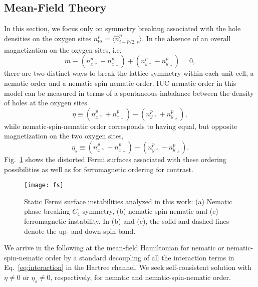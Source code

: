 \documentclass[prb, twocolumn,showpacs,preprintnumbers,amsmath,amssymb, floatfix]{revtex4}
\begin{document}
\subsection{Mean-Field Theory}
\label{subsec:model}
In this section, we focus only on symmetry breaking associated
with the hole densities on the oxygen sites $n^{p}_{\nu s} = \langle
\hat{n}^{p}_{i+\hat{\nu}/2 , s}\rangle$.
In the absence of an overall magnetization on the oxygen sites, i.e.
\begin{equation}
  m\equiv (n_{x\uparrow}^p-n_{x\downarrow}^{p}) + (n_{y\uparrow}^p - n_{y\downarrow}^p)=0,
  \label{eq:mag}
\end{equation}
there are  two
distinct ways to break the lattice symmetry within each unit-cell, a nematic order and a
nematic-spin nematic order.
IUC nematic order in this model can be measured in terms of
a spontaneous imbalance between the density of holes at the oxygen sites
\begin{equation}
  \eta\equiv (n_{x\uparrow}^p+n_{x\downarrow}^{p}) -(n_{y\uparrow}^p + n_{y\downarrow}^p),
  \label{eq:eta}
\end{equation}
while nematic-spin-nematic order corresponds to having equal, but opposite magnetization on the two oxygen sites, 
\begin{equation}
  \eta_s\equiv (n_{x\uparrow}^p-n_{x\downarrow}^{p}) -(n_{y\uparrow}^p - n_{y\downarrow}^p).
  \label{eq:etas}
\end{equation}
Fig.~\ref{fig:fs} shows the distorted Fermi surfaces associated with
these ordering possibilities as well as for ferromagnetic ordering for contrast.
\begin{figure}[tb]
  \begin{center}
    \texttt{[image: fs]}
  \end{center}
  \caption{Static Fermi surface instabilities analyzed in this work:
    (a) Nematic phase breaking $C_{4}$ symmetry, (b)
    nematic-spin-nematic and (c) ferromagnetic instability. 
    In (b) and (c), the solid and dashed lines denote the up- and down-spin band.
    }
  \label{fig:fs}
\end{figure}

We arrive in the following at the mean-field Hamiltonian for nematic or
nematic-spin-nematic order by a standard decoupling of all the
interaction terms in Eq.~\eqref{eq:interaction} in the Hartree
channel. We seek self-consistent solution with $\eta\neq0$ or
$\eta_s\neq0$, respectively, for nematic and nematic-spin-nematic
order. 
\end{document}
